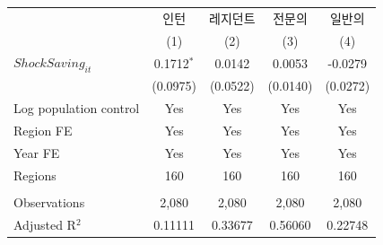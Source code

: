 \begingroup
\centering
\begin{tabular}{lcccc}
   \toprule
                          & 인턴         & 레지던트 & 전문의   & 일반의 \\   
                          & (1)          & (2)      & (3)      & (4)\\  
   \midrule 
   $ShockSaving_{it}$     & 0.1712$^{*}$ & 0.0142   & 0.0053   & -0.0279\\   
                          & (0.0975)     & (0.0522) & (0.0140) & (0.0272)\\   
   Log population control & Yes          & Yes      & Yes      & Yes\\  
   Region FE              & Yes          & Yes      & Yes      & Yes\\  
   Year FE                & Yes          & Yes      & Yes      & Yes\\  
   Regions                & 160          & 160      & 160      & 160\\  
    \\
   Observations           & 2,080        & 2,080    & 2,080    & 2,080\\  
   Adjusted R$^2$         & 0.11111      & 0.33677  & 0.56060  & 0.22748\\  
   \bottomrule
\end{tabular}
\par\endgroup
